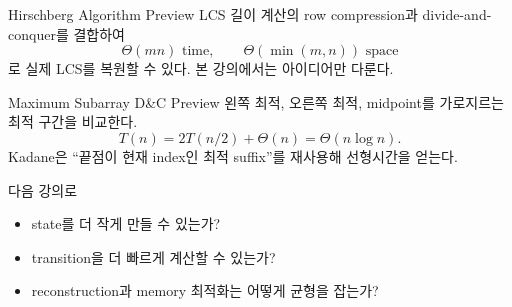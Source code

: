\begin{frame}{Hirschberg Algorithm Preview}
\optional[Appendix]\hfill
LCS 길이 계산의 row compression과 divide-and-conquer를 결합하여
\[
\Theta(mn)\text{ time},\qquad \Theta(\min(m,n))\text{ space}
\]
로 실제 LCS를 복원할 수 있다. 본 강의에서는 아이디어만 다룬다.
\end{frame}
\begin{frame}{Maximum Subarray D\&C Preview}
\optional[Appendix]\hfill
왼쪽 최적, 오른쪽 최적, midpoint를 가로지르는 최적 구간을 비교한다.
\[
T(n)=2T(n/2)+\Theta(n)=\Theta(n\log n).
\]
Kadane은 “끝점이 현재 index인 최적 suffix”를 재사용해 선형시간을 얻는다.
\end{frame}
\begin{frame}{다음 강의로}
\begin{itemize}\item state를 더 작게 만들 수 있는가?\item transition을 더 빠르게 계산할 수 있는가?\item reconstruction과 memory 최적화는 어떻게 균형을 잡는가?\end{itemize}
\end{frame}
